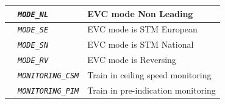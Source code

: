\begin{itemize}
\begin{longtable}{|l|l|l|}
			\hline

			&	\begin{minipage}[t]{0.40\linewidth} \emph{\texttt{MODE\_NL}} \end{minipage}
			&	\begin{minipage}[t]{0.38\linewidth} EVC mode Non Leading \end{minipage} \\

			\hline

			&	\begin{minipage}[t]{0.40\linewidth} \emph{\texttt{MODE\_SE}} \end{minipage}
			&	\begin{minipage}[t]{0.38\linewidth} EVC mode is STM European \end{minipage} \\

			\hline

			&	\begin{minipage}[t]{0.40\linewidth} \emph{\texttt{MODE\_SN}} \end{minipage}
			&	\begin{minipage}[t]{0.38\linewidth} EVC mode is STM National \end{minipage} \\

			\hline

			&	\begin{minipage}[t]{0.40\linewidth} \emph{\texttt{MODE\_RV}} \end{minipage}
			&	\begin{minipage}[t]{0.38\linewidth} EVC mode is Reversing \end{minipage} \\

			\hline

			&	\begin{minipage}[t]{0.40\linewidth} \emph{\texttt{MONITORING\_CSM}} \end{minipage}
			&	\begin{minipage}[t]{0.38\linewidth} Train in ceiling speed monitoring \end{minipage} \\

			\hline

			&	\begin{minipage}[t]{0.40\linewidth} \emph{\texttt{MONITORING\_PIM}} \end{minipage}
			&	\begin{minipage}[t]{0.38\linewidth} Train in pre-indication monitoring \end{minipage} \\


\end{longtable}
\end{itemize}
